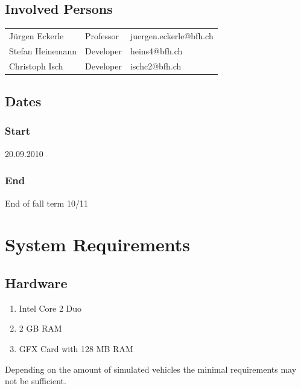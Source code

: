 \documentclass[a4paper,10pt,titlepage]{article}
\begin{document}

\subsection{Involved Persons}

\begin{tabularx}{\textwidth}{XXX}
 Jürgen Eckerle & Professor & juergen.eckerle@bfh.ch \\
 Stefan Heinemann & Developer & heins4@bfh.ch \\
 Christoph Isch & Developer & ischc2@bfh.ch \\
\end{tabularx}

\subsection{Dates}

\subsubsection{Start}
20.09.2010

\subsubsection{End}
End of fall term 10/11

\section{System Requirements}

\subsection{Hardware}
\begin{enumerate}
 \item Intel Core 2 Duo
 \item 2 GB RAM
 \item GFX Card with 128 MB RAM
\end{enumerate}

Depending on the amount of simulated vehicles the minimal requirements may not be sufficient.
\end{document}
